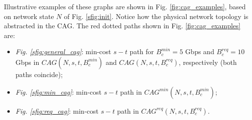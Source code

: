 \documentclass[journal]{IEEEtran}
\begin{document}

Illustrative examples of these graphs are shown in Fig. \ref{fig:cag_examples}, based on network state $N$ of Fig. \ref{sfig:init}. Notice how the physical network topology is abstracted in the CAG. The red dotted paths shown in Fig. \ref{fig:cag_examples} are:
\begin{itemize}
\item \textit{Fig. \ref{sfig:general_cag}}: min-cost $s-t$ path for $B^{min}_{c} = 5$ Gbps and $B^{req}_{c} = 10$ Gbps in $CAG(N, s, t, B^{min}_{c})$ and $CAG(N, s, t, B^{req}_{c})$, respectively (both paths coincide);
\item \textit{Fig. \ref{sfig:min_cag}}: min-cost $s-t$ path in $CAG^{min}(N, s, t, B^{min}_{c})$;
\item \textit{Fig. \ref{sfig:req_cag}}: min-cost $s-t$ path in $CAG^{req}(N, s, t, B^{req}_{c})$.
\end{itemize}
\end{document}

